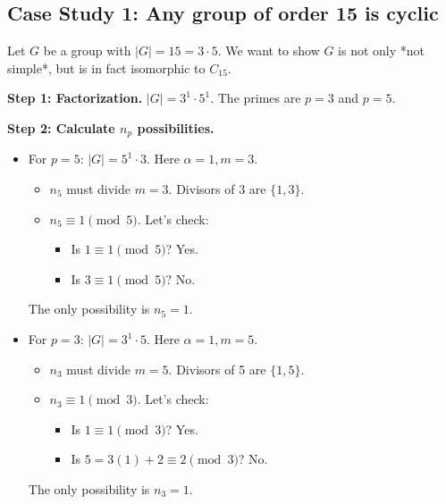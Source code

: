 \documentclass[12pt,a4paper]{article}
\theoremstyle{plain} %
\theoremstyle{definition} %
\theoremstyle{remark} %
\begin{document}
\subsection{Case Study 1: Any group of order 15 is cyclic}
Let $G$ be a group with $|G|=15 = 3 \cdot 5$. We want to show $G$ is not only *not simple*, but is in fact isomorphic to $C_{15}$.

\textbf{Step 1: Factorization.} $|G|=3^1 \cdot 5^1$. The primes are $p=3$ and $p=5$.

\textbf{Step 2: Calculate $n_p$ possibilities.}
\begin{itemize}
    \item For $p=5$: $|G|=5^1 \cdot 3$. Here $\alpha=1, m=3$.
        \begin{itemize}
            \item $n_5$ must divide $m=3$. Divisors of 3 are $\{1, 3\}$.
            \item $n_5 \equiv 1 \pmod{5}$. Let's check:
                \begin{itemize}
                    \item Is $1 \equiv 1 \pmod{5}$? Yes.
                    \item Is $3 \equiv 1 \pmod{5}$? No.
                \end{itemize}
        \end{itemize}
        The only possibility is $n_5=1$.

    \item For $p=3$: $|G|=3^1 \cdot 5$. Here $\alpha=1, m=5$.
        \begin{itemize}
            \item $n_3$ must divide $m=5$. Divisors of 5 are $\{1, 5\}$.
            \item $n_3 \equiv 1 \pmod{3}$. Let's check:
                \begin{itemize}
                    \item Is $1 \equiv 1 \pmod{3}$? Yes.
                    \item Is $5 = 3(1)+2 \equiv 2 \pmod{3}$? No.
                \end{itemize}
        \end{itemize}
        The only possibility is $n_3=1$.
\end{itemize}
\end{document}
